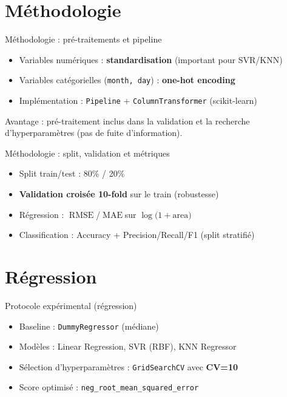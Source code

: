 \documentclass[aspectratio=169,11pt]{beamer}
\newcommand{\Area}{\ensuremath{\mathrm{area}}}
\newcommand{\LogArea}{\ensuremath{\log\!\bigl(1+\Area\bigr)}}
\DeclareRobustCommand{\RMSE}{\ensuremath{\operatorname{RMSE}}}
\DeclareRobustCommand{\MAE}{\ensuremath{\operatorname{MAE}}}
\begin{document}
\section{M\'ethodologie}

\begin{frame}{M\'ethodologie : pr\'e-traitements et pipeline}
  \begin{itemize}
    \item Variables num\'eriques : \textbf{standardisation} (important pour SVR/KNN)
    \item Variables cat\'egorielles (\texttt{month, day}) : \textbf{one-hot encoding}
    \item Impl\'ementation : \texttt{Pipeline} + \texttt{ColumnTransformer} (scikit-learn)
  \end{itemize}

  \vspace{0.4em}
  Avantage : pr\'e-traitement inclus dans la validation et la recherche d'hyperparam\`etres (pas de fuite d'information).
\end{frame}

\begin{frame}{M\'ethodologie : split, validation et m\'etriques}
  \begin{itemize}
    \item Split train/test : 80\% / 20\%
    \item \textbf{Validation crois\'ee 10-fold} sur le train (robustesse)
    \item R\'egression : \RMSE/\MAE sur \(\LogArea\)
    \item Classification : Accuracy + Precision/Recall/F1 (split stratifi\'e)
  \end{itemize}
\end{frame}

\section{R\'egression}

\begin{frame}{Protocole exp\'erimental (r\'egression)}
  \begin{itemize}
    \item Baseline : \texttt{DummyRegressor} (m\'ediane)
    \item Mod\`eles : Linear Regression, SVR (RBF), KNN Regressor
    \item S\'election d'hyperparam\`etres : \texttt{GridSearchCV} avec \textbf{CV=10}
    \item Score optimis\'e : \texttt{neg\_root\_mean\_squared\_error}
  \end{itemize}
\end{frame}
\end{document}
